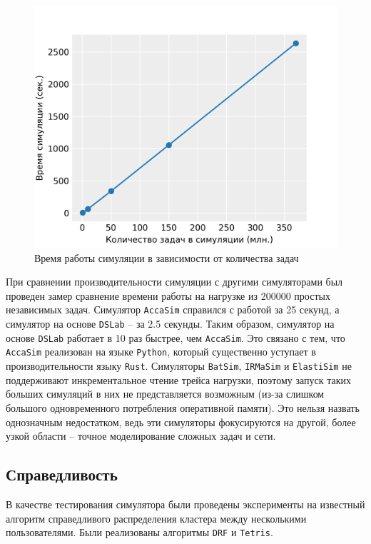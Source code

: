 \begin{figure}[h!]
  \centering 
  \includegraphics[width=0.8\linewidth]{images/simulation_time}
  \caption{Время работы симуляции в зависимости от количества задач}
  \label{fig:speed-test}
\end{figure}

При сравнении производительности симуляции с другими симуляторами был проведен замер сравнение времени работы на нагрузке из 200000 простых независимых задач. Симулятор \texttt{AccaSim} справился с работой за 25 секунд, а симулятор на основе \texttt{DSLab} -- за 2.5 секунды. Таким образом, симулятор на основе \texttt{DSLab} работает в 10 раз быстрее, чем \texttt{AccaSim}. Это связано с тем, что \texttt{AccaSim} реализован на языке \texttt{Python}, который существенно уступает в производительности языку \texttt{Rust}. Симуляторы \texttt{BatSim}, \texttt{IRMaSim} и \texttt{ElastiSim} не поддерживают инкрементальное чтение трейса нагрузки, поэтому запуск таких больших симуляций в них не представляется возможным (из-за слишком большого одновременного потребления оперативной памяти). Это нельзя назвать однозначным недостатком, ведь эти симуляторы фокусируются на другой, более узкой области -- точное моделирование сложных задач и сети.  

\subsection{Справедливость}\label{sec:example-fairness}

В качестве тестирования симулятора были проведены эксперименты на известный алгоритм справедливого распределения кластера между несколькими пользователями. Были реализованы алгоритмы \texttt{DRF}\cite{drf-article} и \texttt{Tetris}\cite{tetris-article}. 

